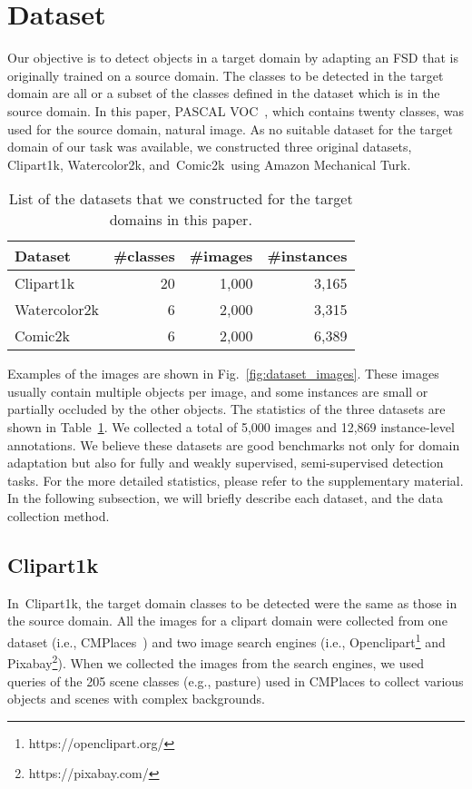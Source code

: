 \documentclass[10pt,twocolumn,letterpaper]{article}
\newcommand{\Tref}[1]{Table~\ref{#1}}
\newcommand{\Fref}[1]{Fig.~\ref{#1}}
\newcommand{\datasetclipart}{Clipart1k}
\newcommand{\datasetwatercolor}{Watercolor2k}
\newcommand{\datasetcomic}{Comic2k}
\begin{document}
\section{Dataset}
\label{sec:dataset}
Our objective is to detect objects in a target domain by adapting an FSD that is originally trained on a source domain.
The classes to be detected in the target domain are all or a subset of the classes defined in the dataset which is in the source domain.
In this paper, PASCAL VOC~\cite{everingham2010pascal}, which contains twenty classes, was used for the source domain, natural image.
As no suitable dataset for the target domain of our task was available, we constructed three original datasets, \datasetclipart, \datasetwatercolor, and~\datasetcomic~using Amazon Mechanical Turk.

\begin{table}[t]
  \caption{List of the datasets that we constructed for the target domains in this paper.}
  \label{tbl:comparison_of_datasets}
  \centering
  \begin{tabular}{@{}lrrr@{}} \toprule
    Dataset & \#classes & \#images & \#instances \\ \midrule
    \datasetclipart & 20 & 1,000 & 3,165 \\
    \datasetwatercolor & 6 & 2,000 & 3,315 \\
    \datasetcomic & 6 & 2,000 & 6,389 \\ \bottomrule
  \end{tabular}
\end{table} Examples of the images are shown in \Fref{fig:dataset_images}. 
These images usually contain multiple objects per image, and
some instances are small or partially occluded by the other objects.
The statistics of the three datasets are shown in \Tref{tbl:comparison_of_datasets}.
We collected a total of 5,000 images and 12,869 instance-level annotations.
We believe these datasets are good benchmarks not only for domain adaptation but also for fully and weakly supervised, semi-supervised detection tasks.
For the more detailed statistics, please refer to the supplementary material.
In the following subsection, we will briefly describe each dataset, and the data collection method.

\subsection{\datasetclipart}
In~\datasetclipart, the target domain classes to be detected were the same as those in the source domain.
All the images for a clipart domain were collected from one dataset (i.e., CMPlaces~\cite{castrejon2016learning}) and two image search engines (i.e., Openclipart\footnote{https://openclipart.org/} and Pixabay\footnote{https://pixabay.com/}).
When we collected the images from the search engines, we used 
queries of the 205 scene classes (e.g., pasture) used in CMPlaces to collect various objects and scenes with complex backgrounds.
\end{document}
